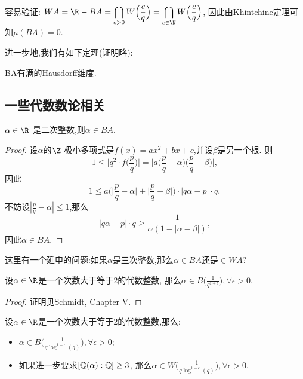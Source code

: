 容易验证: $\displaystyle WA = \R - BA 
= \bigcap_{c>0} W\Big(\frac cq\Big) 
= \bigcap_{c\in \N} W\Big(\frac cq\Big)$,
因此由Khintchine定理可知$\mu(BA) = 0$.

进一步地,我们有如下定理(证明略):
\begin{theorem}
    BA有满的Hausdorff维度.
\end{theorem}

\subsection{一些代数数论相关}
\begin{proposition}
    $\alpha\in \R$ 是二次整数,则$\alpha \in BA$.

\end{proposition}

\begin{proof}
    设$\alpha$的$\Z$-极小多项式是$f(x) = ax^2 + bx + c$,并设$\beta$是另一个根.
    则
    \[
        1  \leq  \bigg|q^2 \cdot f\Big(\frac pq\Big)\bigg| 
        =   \bigg|a\Big(\frac pq - \alpha\Big)\Big(\frac pq - \beta\Big)\bigg|,
    \]
    因此\[1\leq a\Big(\Big|\frac pq - \alpha\Big| + \Big|\frac pq - \beta\Big|\Big) \cdot |q\alpha - p| \cdot q,\]
    不妨设$|\frac pq - \alpha| \leq 1$,那么
    \[|q\alpha - p| \cdot q \geq \frac{1}{\alpha(1-|\alpha - \beta|)},\]
    因此$\alpha \in BA$.
\end{proof}

这里有一个延申的问题:如果$\alpha$是三次整数,那么$\alpha \in BA$还是$\in WA$?

\begin{theorem}[Roth, 1955]
    设$\alpha \in \R$是一个次数大于等于$2$的代数整数,
    那么$\alpha \in B\big(\frac{1}{q^{1+\epsilon}}\big), \forall \epsilon > 0$.

\end{theorem}
\begin{proof}
    证明见Schmidt, Chapter V.
\end{proof}

\begin{conjecture}[S.Lang]
    设$\alpha \in \R$是一个次数大于等于$2$的代数整数,那么:
    \begin{itemize}
        \item $\alpha \in B\big(\frac{1}{q\log^{1+\epsilon}(q)}\big),\forall \epsilon > 0$;
        \item 如果进一步要求$[\mathbb{Q}(\alpha):\mathbb{Q}] \geq 3$,
        那么$\alpha \in W\big(\frac{1}{q\log^{1-\epsilon}(q)}\big),\forall \epsilon > 0$.
    \end{itemize}
\end{conjecture}


